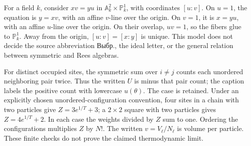 \documentclass[11pt]{article}
\begin{document}
For a field \(k\), consider \(xv=yu\) in \(\mathbb A^2_k\times\mathbb P^1_k\), with coordinates \([u:v]\). On \(u=1\), the equation is \(y=xv\), with an affine \(v\)-line over the origin. On \(v=1\), it is \(x=yu\), with an affine \(u\)-line over the origin. On their overlap, \(uv=1\), so the fibers glue to \(\mathbb P^1_k\). Away from the origin, \([u:v]=[x:y]\) is unique. This model does not decide the source abbreviation Выбр., the ideal letter, or the general relation between symmetric and Rees algebras.

For distinct occupied sites, the symmetric sum over \(i\ne j\) counts each unordered neighboring pair twice. Thus the written \(U\) is minus that pair count; the caption labels the positive count with lowercase \(u(\theta)\). The case is retained. Under an explicitly chosen unordered-configuration convention, four sites in a chain with two particles give \(Z=3e^{1/T}+3\); a \(2\times2\) square with two particles gives \(Z=4e^{1/T}+2\). In each case the weights divided by \(Z\) sum to one. Ordering the configurations multiplies \(Z\) by \(N!\). The written \(v=V_\ell/N_\ell\) is volume per particle. These finite checks do not prove the claimed thermodynamic limit.
\end{document}
